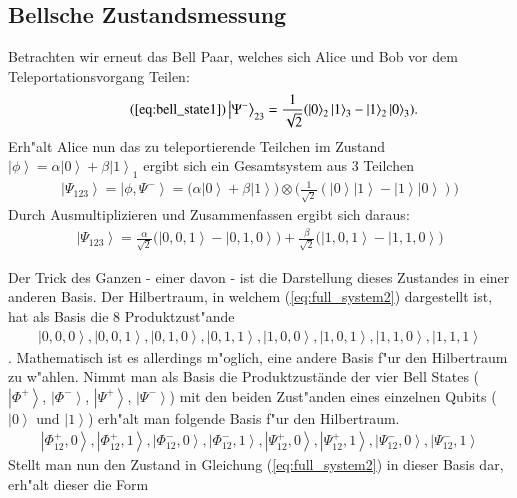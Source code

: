 \begin{refsection}
\subsection{Bellsche Zustandsmessung}\label{sec:bell-measurement}
Betrachten wir erneut das Bell Paar, welches sich Alice und Bob vor dem Teleportationsvorgang Teilen:
\begin{align}  \tag{\ref{eq:bell_state1}}
 \left|\Psi^{-}\right\rangle_{23} = \frac{1}{\sqrt{2}} ( \left|0\right\rangle_{2}\left|1\right\rangle_{3} - \left|1\right\rangle_{2}\left|0\right\rangle_{3} ).
\end{align}
Erh"alt Alice nun das zu teleportierende Teilchen im Zustand $\left|\phi\right\rangle = \alpha\left|0\right\rangle + \beta\left|1\right\rangle_{1}$ ergibt sich ein Gesamtsystem aus 3 Teilchen
\begin{align}\label{eq:full_system1}
\left|\Psi_{123}\right\rangle = \left| \phi, \Psi^{-} \right\rangle = \big( \alpha \left| 0 \right\rangle + \beta \left| 1 \right\rangle \big) \otimes \big( \frac{1}{\sqrt{2}} ( \left|0\right\rangle \left|1\right\rangle - \left|1\right\rangle \left|0\right\rangle ) \big)
\end{align}
Durch Ausmultiplizieren und Zusammenfassen ergibt sich daraus:
\begin{align}\label{eq:full_system2}
\left|\Psi_{123}\right\rangle = \frac{\alpha}{\sqrt{2}} \big(\left|0, 0, 1 \right\rangle - \left|0, 1, 0 \right\rangle  \big) + \frac{\beta}{\sqrt{2}} \big(\left|1, 0, 1 \right\rangle - \left|1, 1, 0 \right\rangle \big)
\end{align}

Der Trick des Ganzen - einer davon - ist die Darstellung dieses Zustandes in einer anderen Basis. Der Hilbertraum, in welchem (\ref{eq:full_system2}) dargestellt ist, hat als Basis die 8 Produktzust"ande
\begin{align}
\left|  0,0,0 \right \rangle,\left|  0,0,1 \right \rangle,\left|  0,1,0 \right \rangle,\left|  0,1,1 \right \rangle,\left|  1,0,0 \right \rangle,\left|  1,0,1 \right \rangle,\left|  1,1,0 \right \rangle,\left|  1,1,1 \right \rangle
\end{align}.
Mathematisch ist es allerdings m"oglich, eine andere Basis f"ur den Hilbertraum zu w"ahlen. Nimmt man als Basis die Produktzustände der vier Bell States ($\left|\Phi^+\right\rangle$, $\left|\Phi^-\right\rangle$, $\left|\Psi^+\right\rangle$, $\left|\Psi^-\right\rangle$) mit den beiden Zust"anden eines einzelnen Qubits ($\left|0\right\rangle$ und $\left|1\right\rangle$) erh"alt man folgende Basis f"ur den Hilbertraum.
\begin{align}
\left|\Phi^{+}_{12},0\right\rangle,
\left|\Phi^{+}_{12},1\right\rangle, 
\left|\Phi^{-}_{12},0\right\rangle,
\left|\Phi^{-}_{12},1\right\rangle,
\left|\Psi^{+}_{12},0\right\rangle,
\left|\Psi^{+}_{12},1\right\rangle,
\left|\Psi^{-}_{12},0\right\rangle,
\left|\Psi^{-}_{12},1\right\rangle
\end{align}
Stellt man nun den Zustand in Gleichung (\ref{eq:full_system2}) in dieser Basis dar, erh"alt dieser die Form


\end{refsection}
